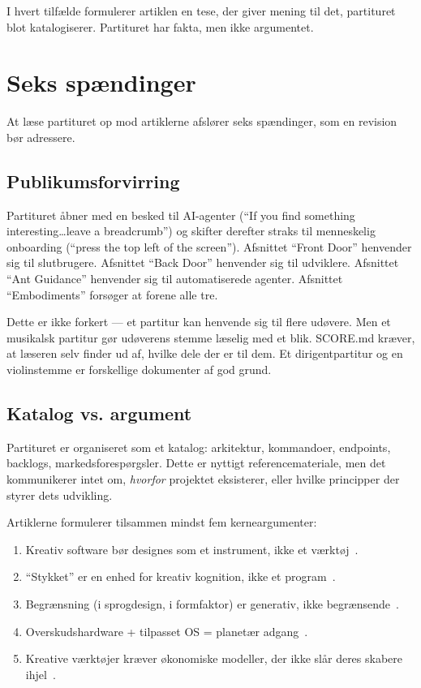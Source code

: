 \documentclass[10pt,letterpaper,twocolumn]{article}
\begin{document}
I hvert tilf\ae lde formulerer artiklen en tese, der giver mening til det, partituret blot katalogiserer. Partituret har fakta, men ikke argumentet.

\section{Seks sp\ae ndinger}

At l\ae se partituret op mod artiklerne afsl\o rer seks sp\ae ndinger, som en revision b\o r adressere.

\subsection{Publikumsforvirring}

Partituret \aa bner med en besked til AI-agenter (``If you find something interesting\ldots leave a breadcrumb'') og skifter derefter straks til menneskelig onboarding (``press the top left of the screen''). Afsnittet ``Front Door'' henvender sig til slutbrugere. Afsnittet ``Back Door'' henvender sig til udviklere. Afsnittet ``Ant Guidance'' henvender sig til automatiserede agenter. Afsnittet ``Embodiments'' fors\o ger at forene alle tre.

Dette er ikke forkert --- et partitur kan henvende sig til flere ud\o vere. Men et musikalsk partitur g\o r ud\o verens stemme l\ae selig med et blik. SCORE.md kr\ae ver, at l\ae seren selv finder ud af, hvilke dele der er til dem. Et dirigentpartitur og en violinstemme er forskellige dokumenter af god grund.

\subsection{Katalog vs. argument}

Partituret er organiseret som et katalog: arkitektur, kommandoer, endpoints, backlogs, markedsforesp\o rgsler. Dette er nyttigt referencemateriale, men det kommunikerer intet om, \emph{hvorfor} projektet eksisterer, eller hvilke principper der styrer dets udvikling.

Artiklerne formulerer tilsammen mindst fem kerneargumenter:
\begin{enumerate}
\item Kreativ software b\o r designes som et instrument, ikke et v\ae rkt\o j~\citep{scudder2026goodiepal}.
\item ``Stykket'' er en enhed for kreativ kognition, ikke et program~\citep{scudder2026pieces}.
\item Begr\ae nsning (i sprogdesign, i formfaktor) er generativ, ikke begr\ae nsende~\citep{scudder2026kidlisp, scudder2026cards}.
\item Overskudshardware + tilpasset OS = planet\ae r adgang~\citep{scudder2026os, scudder2026plork}.
\item Kreative v\ae rkt\o jer kr\ae ver \o konomiske modeller, der ikke sl\aa r deres skabere ihjel~\citep{scudder2026sustainability}.
\end{enumerate}
\end{document}
